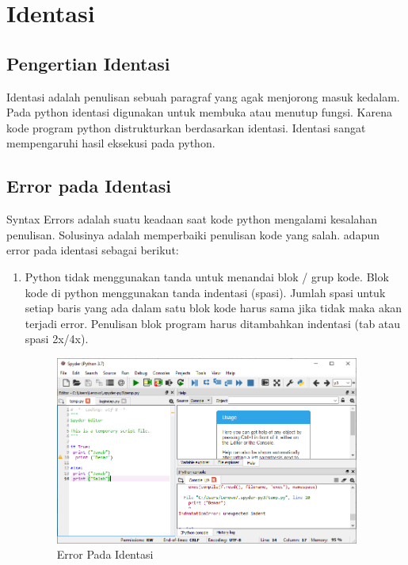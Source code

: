 \chapter{Identasi}
		\section{Pengertian Identasi} 
		Identasi adalah penulisan sebuah paragraf yang agak menjorong masuk kedalam. Pada python identasi digunakan untuk membuka atau menutup fungsi. Karena kode program python distrukturkan berdasarkan identasi. Identasi sangat mempengaruhi hasil eksekusi pada python.
		
		\section{Error pada Identasi} 
        Syntax Errors adalah suatu keadaan saat kode python mengalami kesalahan penulisan. Solusinya adalah memperbaiki penulisan kode yang salah.
        adapun error pada identasi sebagai berikut:
        \begin{enumerate}
            \item Python tidak menggunakan tanda { } untuk menandai blok / grup kode. Blok kode di python menggunakan tanda indentasi (spasi). Jumlah spasi untuk setiap baris yang ada dalam satu blok kode harus sama jika tidak maka akan terjadi error. Penulisan blok program harus ditambahkan indentasi (tab atau spasi 2x/4x).
            \begin{figure}[!htpb]
			\includegraphics[width=10cm]{figures/identi2.PNG}
				\centering
			\caption{Error Pada Identasi}
		\end{figure}
        \end{enumerate}
        \newpage
        
